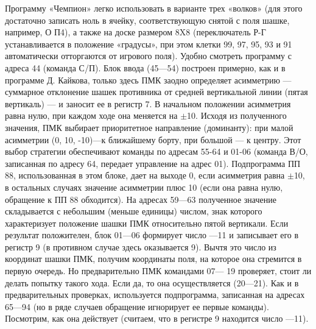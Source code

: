 \documentclass[11pt,a4paper,oneside]{article}
\begin{document}
Программу «Чемпион» легко использовать в варианте трех «волков» (для этого достаточно записать ноль в ячейку, соответствующую снятой с поля шашке, например, О П4), а также на доске размером 8X8 (переключатель Р-Г устанавливается в положение «градусы», при этом клетки 99, 97, 95, 93 и 91 автоматически отторгаются от игрового поля). Удобно смотреть программу с адреса 44 (команда С/П). Блок ввода (45—54) построен примерно, как и в программе Д. Кайкова, только здесь ПМК заодно определяет асимметрию — суммарное отклонение шашек противника от средней вертикальной линии (пятая вертикаль) — и заносит ее в регистр 7. В начальном положении асимметрия равна нулю, при каждом ходе она меняется на $\pm$10. Исходя из полученного значения, ПМК выбирает приоритетное направление (доминанту): при малой асимметрии (0, 10, -10)—к ближайшему борту, при большой — к центру. Этот выбор стратегии обеспечивают команды по адресам 55-64 и 01-06 (команда В/О, записанная по адресу 64, передает управление на адрес 01). Подпрограмма ПП 88, использованная в этом блоке, дает на выходе 0, если асимметрия равна $\pm$10, в остальных случаях значение асимметрии плюс 10 (если она равна нулю, обращение к ПП 88 обходится). На адресах 59—63 полученное значение складывается с небольшим (меньше единицы) числом, знак которого характеризует положение шашки ПМК относительно пятой вертикали. Если результат положителен, блок 01—06 формирует число —11 и записывает его в регистр 9 (в противном случае здесь оказывается 9). Вычтя это число из координат шашки ПМК, получим координаты поля, на которое она стремится в первую очередь. Но предварительно ПМК командами 07— 19 проверяет, стоит ли делать попытку такого хода. Если да, то она осуществляется (20—21). Как и в предварительных проверках, используется подпрограмма, записанная на адресах 65—94 (но в ряде случаев обращение игнорирует ее первые команды). Посмотрим, как она действует (считаем, что в регистре 9 находится число —11).
\end{document}
